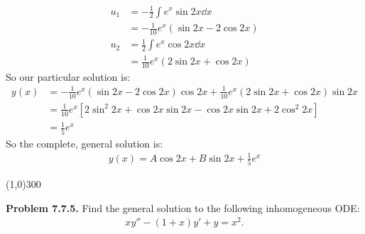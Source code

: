 \documentclass{article}
\begin{document}
\begin{equation*}
\begin{aligned}
	u_1 &= -\frac{1}{2}\int e^x \sin 2x \dd x \\
		&= -\frac{1}{10}e^x\left(\sin 2x - 2\cos 2x\right) \\
	u_2 &= \frac{1}{2}\int e^x \cos 2x \dd x \\
		&= \frac{1}{10}e^x\left(2\sin 2x + \cos 2x\right)
\end{aligned}
\end{equation*}
So our particular solution is:
\begin{equation*}
\begin{aligned}
	y(x) &= -\frac{1}{10}e^x\left(\sin 2x - 2\cos 2x\right)\cos 2x + \frac{1}{10}e^x\left(2\sin 2x + \cos 2x\right)\sin 2x \\
		&= \frac{1}{10}e^x \left[2\sin ^2 2x + \cos 2x\sin 2x - \cos 2x\sin 2x + 2\cos ^2 2x\right] \\
		&= \frac{1}{5}e^x
\end{aligned}
\end{equation*}
So the complete, general solution is:
\begin{equation*}
\begin{aligned}
	\boxed{y(x) = A\cos 2x + B\sin 2x + \frac{1}{5}e^x}
\end{aligned}
\end{equation*}

\begin{center}
\line(1,0){300}
\end{center}
\textbf{Problem 7.7.5.} Find the general solution to the following inhomogeneous ODE:
\begin{equation*}
\begin{aligned}
	xy'' -(1+x)y' + y = x^2.
\end{aligned}
\end{equation*}
\end{document}
